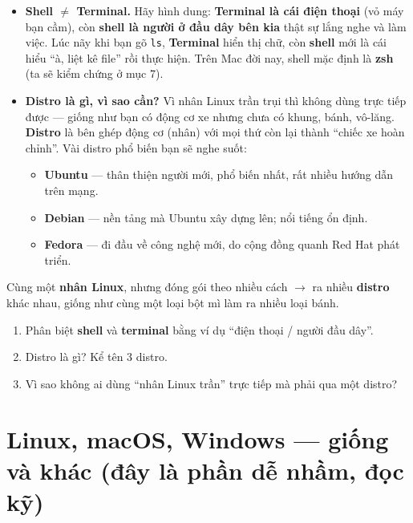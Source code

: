 \documentclass[12pt,a4paper]{article}
\begin{document}
\begin{itemize}[leftmargin=*]
  \item \textbf{Shell $\neq$ Terminal.} Hãy hình dung: \textbf{Terminal là cái điện thoại} (vỏ máy bạn cầm), còn \textbf{shell là người ở đầu dây bên kia} thật sự lắng nghe và làm việc. Lúc nãy khi bạn gõ \texttt{ls}, \textbf{Terminal} hiển thị chữ, còn \textbf{shell} mới là cái hiểu ``à, liệt kê file'' rồi thực hiện. Trên Mac đời nay, shell mặc định là \textbf{zsh} (ta sẽ kiểm chứng ở mục 7).
  \item \textbf{Distro là gì, vì sao cần?} Vì nhân Linux trần trụi thì không dùng trực tiếp được — giống như bạn có động cơ xe nhưng chưa có khung, bánh, vô-lăng. \textbf{Distro} là bên ghép động cơ (nhân) với mọi thứ còn lại thành ``chiếc xe hoàn chỉnh''. Vài distro phổ biến bạn sẽ nghe suốt:
  \begin{itemize}[leftmargin=*]
    \item \textbf{Ubuntu} — thân thiện người mới, phổ biến nhất, rất nhiều hướng dẫn trên mạng.
    \item \textbf{Debian} — nền tảng mà Ubuntu xây dựng lên; nổi tiếng ổn định.
    \item \textbf{Fedora} — đi đầu về công nghệ mới, do cộng đồng quanh Red Hat phát triển.
  \end{itemize}
\end{itemize}

\begin{tipbox}
Cùng một \textbf{nhân Linux}, nhưng đóng gói theo nhiều cách $\rightarrow$ ra nhiều \textbf{distro} khác nhau, giống như cùng một loại bột mì làm ra nhiều loại bánh.
\end{tipbox}

\begin{quizbox}
\begin{enumerate}[leftmargin=*]
  \item Phân biệt \textbf{shell} và \textbf{terminal} bằng ví dụ ``điện thoại / người đầu dây''.
  \item Distro là gì? Kể tên 3 distro.
  \item Vì sao không ai dùng ``nhân Linux trần'' trực tiếp mà phải qua một distro?
\end{enumerate}
\end{quizbox}

\section{Linux, macOS, Windows — giống và khác (đây là phần dễ nhầm, đọc kỹ)}
\end{document}
